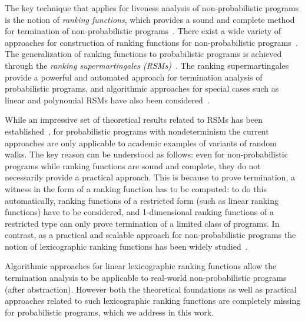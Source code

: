 \smallskip{}
The key technique that applies for liveness analysis of non-probabilistic programs is 
the notion of {\em ranking functions}, which provides a sound and complete 
method for termination of non-probabilistic programs~\cite{rwfloyd1967programs}.
There exist a wide variety of approaches for construction 
of ranking functions for non-probabilistic programs~\cite{DBLP:conf/cav/BradleyMS05,DBLP:conf/tacas/ColonS01,DBLP:conf/vmcai/PodelskiR04,DBLP:conf/pods/SohnG91}.
The generalization of ranking functions to probabilistic programs is achieved through the
{\em ranking supermartingales (RSMs)}~\cite{SriramCAV,HolgerPOPL,CF17}.
The ranking supermartingales provide a powerful and automated approach for termination 
analysis of probabilistic programs, and algorithmic approaches for special cases such as 
linear and polynomial RSMs have also been considered~\cite{SriramCAV,CFNH16:prob-termination,CFG16,CNZ17}.



\smallskip{} 
While an impressive set of theoretical results related to RSMs has been
established~\cite{SriramCAV,HolgerPOPL,CF17,CFNH16:prob-termination,CFG16,CNZ17},
 for probabilistic programs with nondeterminism the current approaches  
are only applicable to academic examples of variants of random walks. 
The key reason can be understood as follows: even for non-probabilistic programs while 
ranking functions are sound and complete, they do not necessarily provide a practical 
approach. This is because to prove termination, a witness in the form of a 
ranking function has to be computed: to do this automatically, ranking 
functions 
of a restricted form (such as linear ranking functions) have to be considered, 
and 1-dimensional ranking functions of a restricted type can only prove 
termination of a limited class of programs. 
In contrast, as a practical and scalable approach for non-probabilistic programs the 
notion of lexicographic ranking functions has been widely 
studied~\cite{CSZ13,ADFG10:lexicographic,GMR15:rank-extremal,BCIKP16:T2, 
DBLP:conf/cav/BradleyMS05}.
 
Algorithmic approaches for linear lexicographic ranking functions allow the 
termination analysis 
to be applicable to real-world non-probabilistic programs (after abstraction).
However both the theoretical foundations as well as practical approaches related to 
such lexicographic ranking functions are completely missing for probabilistic programs,
which we address in this work.







